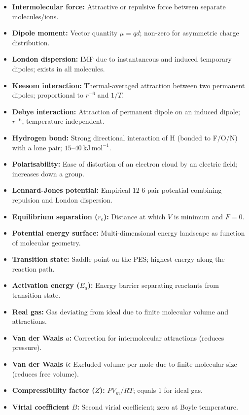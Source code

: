 \documentclass[12pt,a4paper]{article}
\begin{document}
\begin{tcolorbox}[defbox, title={One-Line Definitions}]
\begin{itemize}[leftmargin=*, itemsep=2pt, topsep=2pt]
  \item \textbf{Intermolecular force:} Attractive or repulsive force between separate molecules/ions.
  \item \textbf{Dipole moment:} Vector quantity $\mu = qd$; non-zero for asymmetric charge distribution.
  \item \textbf{London dispersion:} IMF due to instantaneous and induced temporary dipoles; exists in all molecules.
  \item \textbf{Keesom interaction:} Thermal-averaged attraction between two permanent dipoles; proportional to $r^{-6}$ and $1/T$.
  \item \textbf{Debye interaction:} Attraction of permanent dipole on an induced dipole; $r^{-6}$, temperature-independent.
  \item \textbf{Hydrogen bond:} Strong directional interaction of H (bonded to F/O/N) with a lone pair; $15$--$40\ \mathrm{kJ\,mol^{-1}}$.
  \item \textbf{Polarisability:} Ease of distortion of an electron cloud by an electric field; increases down a group.
  \item \textbf{Lennard-Jones potential:} Empirical 12-6 pair potential combining repulsion and London dispersion.
  \item \textbf{Equilibrium separation ($r_e$):} Distance at which $V$ is minimum and $F = 0$.
  \item \textbf{Potential energy surface:} Multi-dimensional energy landscape as function of molecular geometry.
  \item \textbf{Transition state:} Saddle point on the PES; highest energy along the reaction path.
  \item \textbf{Activation energy ($E_a$):} Energy barrier separating reactants from transition state.
  \item \textbf{Real gas:} Gas deviating from ideal due to finite molecular volume and attractions.
  \item \textbf{Van der Waals $a$:} Correction for intermolecular attractions (reduces pressure).
  \item \textbf{Van der Waals $b$:} Excluded volume per mole due to finite molecular size (reduces free volume).
  \item \textbf{Compressibility factor ($Z$):} $PV_m/RT$; equals 1 for ideal gas.
  \item \textbf{Virial coefficient $B$:} Second virial coefficient; zero at Boyle temperature.

\end{itemize}
\end{tcolorbox}
\end{document}
